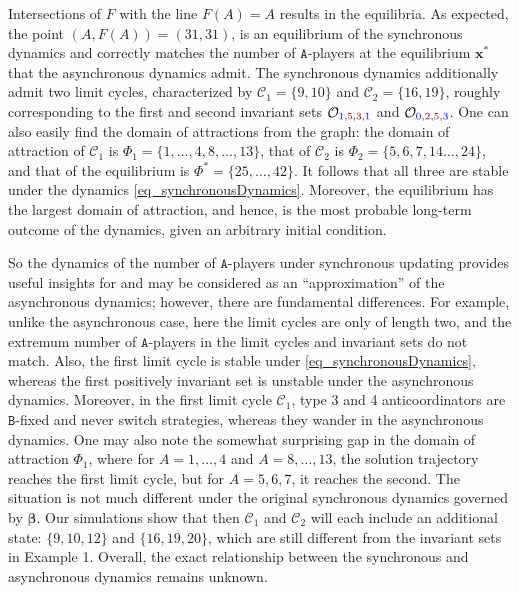 \documentclass[10 pt,twocolumn,journal]{IEEEtran}
\theoremstyle{plain}
\newcommand{\A}{\mathcal{A}}
\renewcommand{\O}{\mathcal{O}}
\newcommand{\C}{\mathcal{C}}
\newcommand{\x}{\bm{x}}
\renewcommand{\b}{\bm{\beta}}
\renewcommand{\A}{\mathtt{A}}
\newcommand{\B}{\mathtt{B}}
\newcommand{\tb}{\textcolor{blue}}
\newcommand{\tr}{\textcolor{Myred}}
\theoremstyle{definition}
\begin{document}
Intersections of $F$ with the line $F(A)=A$ results in the equilibria. 
As expected, the point $(A,F(A))=(31,31)$, is an equilibrium of the synchronous dynamics and correctly matches the number of $\A$-players at the equilibrium $\x^*$ that the asynchronous dynamics admit. 
The synchronous dynamics additionally admit two limit cycles, characterized by $\C_1=\{9,10\}$ and  $\C_2=\{16,19\}$, roughly corresponding to the first and second invariant sets $\O_{\tb{1}, \tr{5}, \tr{3}, \tb{1}}$ and $\O_{\tb{0}, \tr{2}, \tr{5}, \tb{3}}$. 
One can also easily find the domain of attractions from the graph: 
the domain of attraction of $\C_1$ is $\Phi_1 = \{1,\ldots,4,8,\ldots,13\}$, that of $\C_2$ is $\Phi_2 = \{5,6,7,14\ldots,24\}$, and that of the equilibrium is $\Phi^*=\{25,\ldots,42\}$.
It follows that all three are stable under the dynamics \eqref{eq_synchronousDynamics}.
Moreover, the equilibrium has the largest domain of attraction, and hence, is the most probable long-term outcome of the dynamics, given an arbitrary initial condition.

So the dynamics of the number of $\A$-players under synchronous updating provides useful insights for and may be considered as an ``approximation'' of the asynchronous dynamics; however, there are fundamental differences. 
For example, unlike the asynchronous case, here the limit cycles are only of length two, and the extremum number of $\A$-players in the limit cycles and invariant sets do not match. 
Also, the first limit cycle is stable under \eqref{eq_synchronousDynamics}, whereas the first positively invariant set is unstable under the asynchronous dynamics. 
Moreover, in the first limit cycle $\C_1$, type 3 and 4 anticoordinators are $\B$-fixed and never switch strategies, whereas they wander in the asynchronous dynamics. 
One may also note the somewhat surprising gap in the domain of attraction $\Phi_1$, where for $A=1,\ldots,4$ and $A=8,\ldots,13$, the solution trajectory reaches the first limit cycle, but for $A=5,6,7$, it reaches the second.
The situation is not much different under the original synchronous dynamics governed by $\b$. 
Our simulations show that then $\C_1$ and $\C_2$ will each include an additional state: $\{9,10,12\}$ and $\{16,19,20\}$, which are still different from the invariant sets in Example 1. 
Overall, the exact relationship between the synchronous and asynchronous dynamics remains unknown. 




\end{document}
